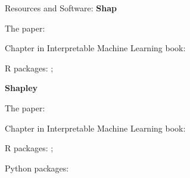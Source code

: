 \documentclass[10pt,compress,t,notes=noshow, xcolor=table]{beamer}
\begin{document}


\begin{framev}[align=top]{Resources and Software:}
\textbf{Shap}
\begin{itemizeM}
\item The paper: 
\item Chapter in Interpretable Machine Learning book: 
\item R packages: ; 
\end{itemizeM}
\spacer[0.25]
\textbf{Shapley}
\begin{itemizeM}
\item The paper: 
\item Chapter in Interpretable Machine Learning book: 
\item R packages: ; 
\item Python packages: 
\end{itemizeM}
\end{framev}


\endlecture
\end{document}
